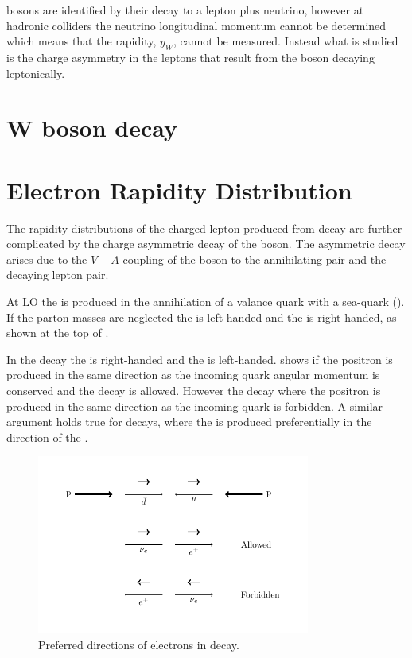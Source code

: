 \PW bosons are identified by their decay to a lepton plus neutrino, however at
hadronic colliders the neutrino longitudinal momentum cannot be determined
which means that the \PW rapidity, $y_{W}$, cannot be measured.  Instead what
is studied is the charge asymmetry in the leptons that result from the \PW boson
decaying leptonically.


\section{W boson decay}
\section{Electron Rapidity Distribution}
The rapidity distributions of the charged lepton produced from \PW decay are
further complicated by the charge asymmetric decay of the \PWpm boson. 
The asymmetric decay arises due to the $V-A$ coupling of the \PW boson to the
annihilating \HepProcess{\Pquark\APquark} pair and the decaying lepton pair.

At \ac{LO} the \PWp is produced in the annihilation of a \Pup valance quark
with a \APdown sea-quark (). 
If the parton masses are neglected the \Pup is left-handed and the \APdown is
right-handed, as shown at the top of . 

In the \PWp decay the \Ppositron is right-handed and the \Pnue is left-handed.
 shows if the  positron is produced in the same direction
as the incoming \APdown quark angular momentum is conserved and the decay is
allowed.
However the decay where the positron is produced in the same direction as the
incoming \Pup quark is forbidden.
A similar argument holds true for \PWm decays, where the \Pelectron is produced
preferentially in the direction of the \Pdown.

\begin{figure}[htbp]
  \centering
  \includegraphics[width=0.8\textwidth]{w_decay_directions}
  \caption{Preferred directions of electrons in 
    \HepProcess{\PWplus\to\APelectron\Pnue} decay.}
  \label{wbos:wspin}
\end{figure}

